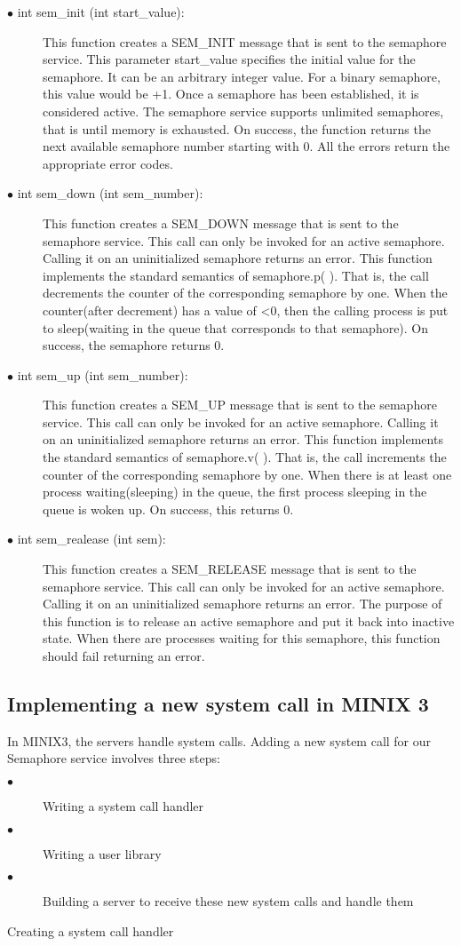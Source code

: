 \documentclass[a4paper,11pt,twocolumn]{article}
\begin{document}
\begin{description}
  \item[$\bullet$ int sem\_init (int start\_value): ] This function creates a SEM\_INIT message that is sent to the semaphore service. This parameter start\_value specifies the initial value for the semaphore. It can be an arbitrary integer value. For a binary semaphore, this value would be +1. Once a semaphore has been established, it  is considered active. The semaphore service supports unlimited semaphores, that is until memory is exhausted. On success, the function returns the next available semaphore number starting with 0. All the errors return the appropriate error codes.
  \item[$\bullet$ int sem\_down (int sem\_number): ] This function creates a SEM\_DOWN message that is sent to the semaphore service. This call can only be invoked for an active semaphore. Calling it on an uninitialized semaphore returns an error. This function implements the standard semantics of semaphore.p( ). That is, the call decrements the counter of the corresponding semaphore by one. When the counter(after decrement) has a value of \textless 0, then the calling process is put to sleep(waiting in the queue that corresponds to that semaphore). On success, the semaphore returns 0.
  \item[$\bullet$ int sem\_up (int sem\_number): ] This function creates a SEM\_UP message that is sent to the semaphore service. This call can only be invoked for an active semaphore. Calling it on an uninitialized semaphore returns an error. This function implements the standard semantics of semaphore.v( ). That is, the call increments the counter of the corresponding semaphore by one. When there is at least one process waiting(sleeping) in the queue, the first process sleeping in the queue is woken up. On success, this returns 0.
  \item[$\bullet$  int sem\_realease (int sem): ] This function creates a SEM\_RELEASE message that is sent to the semaphore service. This call can only be invoked for an active semaphore. Calling it on an uninitialized semaphore returns an error. The purpose of this function is to release an active semaphore and put it back into inactive state. When there are processes waiting for this semaphore, this function should fail returning an error.
\end{description}
\subsection{Implementing a new system call in MINIX 3}
In MINIX3, the servers handle system calls. Adding a new system call for our Semaphore service involves three steps:
\begin{description}
  \item[$\bullet$] Writing a system call handler
  \item[$\bullet$] Writing a user library
  \item[$\bullet$] Building a server to receive these new system calls and handle them
\end{description}
Creating a system call handler
\end{document}
